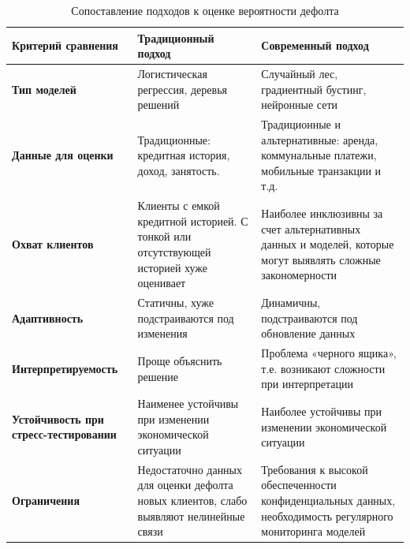 \begin{table}[H]
	\centering
	\caption{Сопоставление подходов к оценке вероятности дефолта}
	\label{tab:compare_default_approaches}
	\small
	\renewcommand{\arraystretch}{1.1}
	\begin{tabular}{|>{\RaggedRight\arraybackslash}p{}|
			>{\RaggedRight\arraybackslash}p{}|
			>{\RaggedRight\arraybackslash}p{}|}
		\hline
		\textbf{Критерий сравнения} & \textbf{Традиционный подход} & \textbf{Современный подход} \\ \hline
		
		\textbf{Тип моделей} 
		& Логистическая регрессия, деревья решений 
		& Случайный лес, градиентный бустинг, нейронные сети \\ \hline
		
		\textbf{Данные для оценки} 
		& Традиционные: кредитная история, доход, занятость.
		& Традиционные и альтернативные: аренда, коммунальные платежи, мобильные транзакции и т.д. \\ \hline
		
		\textbf{Охват клиентов} 
		& Клиенты с емкой кредитной историей. С тонкой или отсутствующей историей хуже оценивает 
		& Наиболее инклюзивны за счет альтернативных данных и моделей, которые могут выявлять сложные закономерности \\ \hline
		
		\textbf{Адаптивность} 
		& Статичны, хуже подстраиваются под изменения 
		& Динамичны, подстраиваются под обновление данных \\ \hline
		
		\textbf{Интерпретируемость} 
		& Проще объяснить решение 
		& Проблема «черного ящика», т.е. возникают сложности при интерпретации \\ \hline
		
		\textbf{Устойчивость при стресс-тестировании}
		& Наименее устойчивы при изменении экономической ситуации 
		& Наиболее устойчивы при изменении экономической ситуации \\ \hline
		
		\textbf{Ограничения} 
		& Недостаточно данных для оценки дефолта новых клиентов, слабо выявляют нелинейные связи 
		& Требования к высокой обеспеченности конфиденциальных данных, необходимость регулярного мониторинга моделей \\ \hline
		
	\end{tabular}
	
\end{table}

